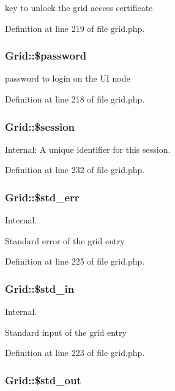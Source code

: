 key to unlock the grid access certificate 



Definition at line 219 of file grid.php.
\subsubsection{\setlength{\rightskip}{0pt plus 5cm}Grid::\$password}\label{classGrid_o3}


password to login on the UI node 



Definition at line 218 of file grid.php.
\subsubsection{\setlength{\rightskip}{0pt plus 5cm}Grid::\$session}\label{classGrid_o12}


Internal: A unique identifier for this session. 



Definition at line 232 of file grid.php.
\subsubsection{\setlength{\rightskip}{0pt plus 5cm}Grid::\$std\_\-err}\label{classGrid_o9}


Internal. 

Standard error of the grid entry 

Definition at line 225 of file grid.php.
\subsubsection{\setlength{\rightskip}{0pt plus 5cm}Grid::\$std\_\-in}\label{classGrid_o7}


Internal. 

Standard input of the grid entry 

Definition at line 223 of file grid.php.
\subsubsection{\setlength{\rightskip}{0pt plus 5cm}Grid::\$std\_\-out}\label{classGrid_o8}



